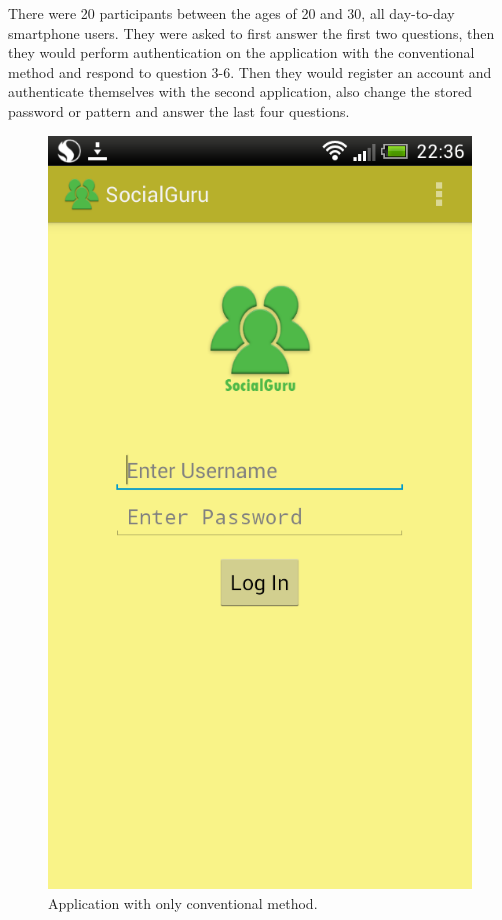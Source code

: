 There were 20 participants between the ages of 20 and 30, all day-to-day smartphone users. They were asked to first answer the first two questions, then they would perform authentication on the application with the conventional method and respond to question 3-6. Then they would register an account and authenticate themselves with the second application, also change the stored password or pattern and answer the last four questions. 

\begin{figure}[H]
\centering
\includegraphics[scale=0.3]{images/nolibrary.png}
\caption{Application with only conventional method.}
\label{fig:nolibrary}
\end{figure}

